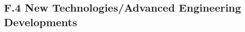 \documentclass[12pt,journal]{IEEEtran}
\begin{document}
\subsection{F.4 New Technologies/Advanced Engineering Developments }
\end{document}
